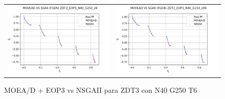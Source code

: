 \begin{figure}[H]
\begin{tabular}{c c}
    \includegraphics[scale=0.5]{figures/ZDT3_EOP3_N40_G250_T6/s9_comp.png} &
    \includegraphics[scale=0.5]{figures/ZDT3_EOP3_N40_G250_T6/s99_comp.png}\\
    \end{tabular}
    \caption{\centering MOEA/D + EOP3 vs NSGAII para ZDT3 con N40 G250 T6}
    \label{fig:5}
\end{figure}


